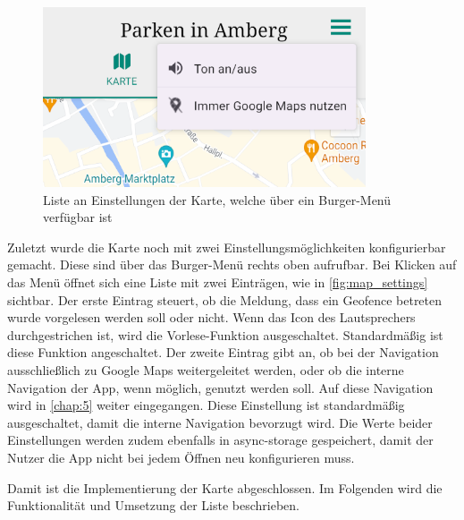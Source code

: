 \begin{figure}
	\vspace{-\baselineskip}
	\centering
	\includegraphics[scale=1]{img/map_settings}
	\caption{Liste an Einstellungen der Karte, welche über ein Burger-Menü verfügbar ist}
	\label{fig:map_settings}
\end{figure}
Zuletzt wurde die Karte noch mit zwei Einstellungsmöglichkeiten konfigurierbar gemacht. Diese sind über das Burger-Menü rechts oben aufrufbar. Bei Klicken auf das Menü öffnet sich eine Liste mit zwei Einträgen, wie in \autoref{fig:map_settings} sichtbar. Der erste Eintrag steuert, ob die Meldung, dass ein Geofence betreten wurde vorgelesen werden soll oder nicht. Wenn das Icon des Lautsprechers durchgestrichen ist, wird die Vorlese-Funktion ausgeschaltet. Standardmäßig ist diese Funktion angeschaltet. Der zweite Eintrag gibt an, ob bei der Navigation ausschließlich zu Google Maps weitergeleitet werden, oder ob die interne Navigation der App, wenn möglich, genutzt werden soll. Auf diese Navigation wird in \autoref{chap:5} weiter eingegangen. Diese Einstellung ist standardmäßig ausgeschaltet, damit die interne Navigation bevorzugt wird. Die Werte beider Einstellungen werden zudem ebenfalls in async-storage gespeichert, damit der Nutzer die App nicht bei jedem Öffnen neu konfigurieren muss.

Damit ist die Implementierung der Karte abgeschlossen. Im Folgenden wird die Funktionalität und Umsetzung der Liste beschrieben.
